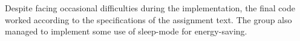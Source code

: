 Despite facing occasional difficulties during the implementation, the final code worked according to the specifications of the assignment text. The group also managed to implement some use of sleep-mode for energy-saving.
